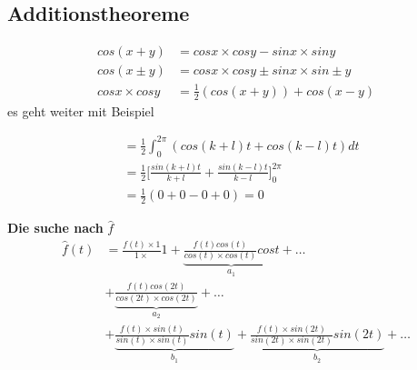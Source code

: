 \subsection{Additionstheoreme}
\begin{align*}
cos( x + y )&= cos x \times cos y - sin x \times sin y \\
cos( x \pm y ) &= cos x \times cos y \pm sin x \times sin \pm y \\
cos x \times cos y &= \frac{1}{2} (cos(x+y))+ cos (x-y)
\end{align*}
es geht weiter mit Beispiel
\begin{example}
\begin{align*}
&= \frac{1}{2} \int_{0}^{2 \pi} (cos(k+l)t + cos(k-l)t)dt\\
&= \frac{1}{2} \Big[ \frac{sin(k+l)t}{k+l} + \frac{sin(k-l)t}{k-l} \Big]_{0}^{2 \pi}\\
&= \frac{1}{2}(0 +0-0+0)=0
\end{align*}
\end{example}
\textbf{Die suche nach } $\hat{f}$
\begin{align*}
\hat{f}(t) &= \frac{f(t) \times 1}{1 \times}1 + \underbrace{\frac{f(t) cos(t)}{cos(t) \times cos(t)}cost }_{a_1} + \dots 
\\ &+ \underbrace{\frac{f(t) cos(2t)}{cos(2t) \times cos(2t)}}_{a_2} + \dots \\
&+ \underbrace{\frac{f(t) \times sin(t)}{sin(t) \times sin(t)}sin(t)}_{b_1} 
+ \underbrace{\frac{f(t) \times sin(2t)}{sin(2t) \times sin(2t)}sin(2t)}_{b_2} + \dots
\end{align*}
